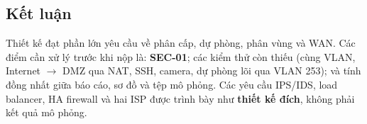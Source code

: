 \subsection{Kết luận}
Thiết kế đạt phần lớn yêu cầu về phân cấp, dự phòng, phân vùng và WAN. Các điểm cần xử lý trước khi nộp là: \textbf{SEC-01}; các kiểm thử còn thiếu (cùng VLAN, Internet $\to$ DMZ qua NAT, SSH, camera, dự phòng lõi qua VLAN 253); và tính đồng nhất giữa báo cáo, sơ đồ và tệp mô phỏng. Các yêu cầu IPS/IDS, load balancer, HA firewall và hai ISP được trình bày như \textbf{thiết kế đích}, không phải kết quả mô phỏng.
